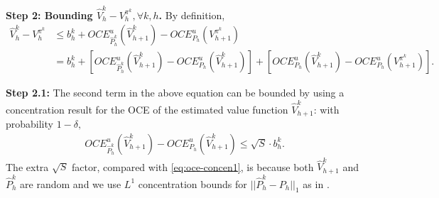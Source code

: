 \documentclass[11pt]{article}
\newcommand{\1}{\mathbbm{1}}
\begin{document}

\noindent\textbf{Step 2: Bounding $\hat{V}_h^k-V_h^{\pi^k},\forall k,h$.} By definition, 
\begin{align*}
\hat{V}_h^k-V_h^{\pi^k}&\le b_h^k+OCE^u_{\hat{P}^k_h}(\hat{V}_{h+1}^k)-OCE_{P_h}^u(V^{\pi^k}_{h+1})\\
&=b_h^k+ \left[OCE^u_{\hat{P}^k_h}(\hat{V}_{h+1}^k)-OCE_{P_h}^u(\hat{V}_{h+1}^k) \right] + \left[OCE_{P_h}^u(\hat{V}_{h+1}^k)-OCE_{P_h}^u(V^{\pi^k}_{h+1})\right].
\end{align*}

\noindent\textbf{Step 2.1:} The second term in the above equation can be bounded by using a concentration result for the OCE of the estimated value function $\hat{V}_{h+1}^k$: with probability $1-\delta,$ 
\begin{align} \label{eq:oce-concen2}
OCE^u_{\hat{P}^k_h}(\hat{V}_{h+1}^k)-OCE_{P_h}^u(\hat{V}_{h+1}^k) \le \sqrt{S} \cdot b_h^k. 
\end{align}
The extra $\sqrt{S}$ factor, compared with \eqref{eq:oce-concen1}, is because both $\hat{V}_{h+1}^k$ and $\hat{P}^k_h$ are random and we use $L^1$ concentration bounds for $||\hat{P}^k_h - {P}_h||_{1}$ as in \cite{jaksch10a}.  
\end{document}
